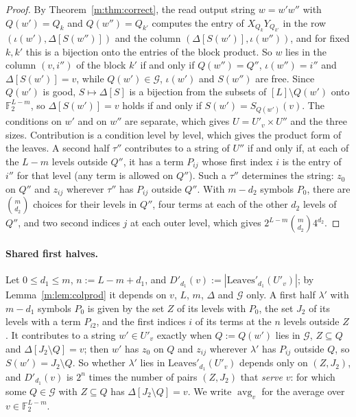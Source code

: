 \documentclass[11pt]{article}
\theoremstyle{definition}
\theoremstyle{remark}
\newcommand{\F}{\mathbb{F}_2}
\newcommand{\Leaves}{\mathrm{Leaves}}
\newcommand{\Qg}{\mathcal{G}}
\begin{document}
\begin{proof}
By Theorem~\ref{m:thm:correct}, the read output string $w=w'w''$ with $Q(w')=Q_k$ and $Q(w'')=Q_{k'}$ computes the entry of $X_{Q_k}Y_{Q_{k'}}$ in the row $(\iota(w'),\Delta[S(w'')])$ and the column $(\Delta[S(w')],\iota(w''))$, and for fixed $k,k'$ this is a bijection onto the entries of the block product. So $w$ lies in the column $(v,i'')$ of the block $k'$ if and only if $Q(w'')=Q''$, $\iota(w'')=i''$ and $\Delta[S(w')]=v$, while $Q(w')\in\Qg$, $\iota(w')$ and $S(w'')$ are free. Since $Q(w')$ is good, $S\mapsto\Delta[S]$ is a bijection from the subsets of $[L]\setminus Q(w')$ onto $\F^{L-m}$, so $\Delta[S(w')]=v$ holds if and only if $S(w')=S_{Q(w')}(v)$. The conditions on $w'$ and on $w''$ are separate, which gives $U=U'_v\times U''$ and the three sizes. Contribution is a condition level by level, which gives the product form of the leaves. A second half $\tau''$ contributes to a string of $U''$ if and only if, at each of the $L-m$ levels outside $Q''$, it has a term $P_{ij}$ whose first index $i$ is the entry of $i''$ for that level (any term is allowed on $Q''$). Such a $\tau''$ determines the string: $z_0$ on $Q''$ and $z_{ij}$ wherever $\tau''$ has $P_{ij}$ outside $Q''$. With $m-d_2$ symbols $P_0$, there are $\binom m{d_2}$ choices for their levels in $Q''$, four terms at each of the other $d_2$ levels of $Q''$, and two second indices $j$ at each outer level, which gives $2^{L-m}\binom m{d_2}4^{d_2}$.
\end{proof}

\paragraph{Shared first halves.} Let $0\le d_1\le m$, $n:=L-m+d_1$, and $D'_{d_1}(v):=|\Leaves'_{d_1}(U'_v)|$; by Lemma~\ref{m:lem:colprod} it depends on $v$, $L$, $m$, $\Delta$ and $\Qg$ only. A first half $\lambda'$ with $m-d_1$ symbols $P_0$ is given by the set $Z$ of its levels with $P_0$, the set $J_2$ of its levels with a term $P_{i2}$, and the first indices $i$ of its terms at the $n$ levels outside $Z$. It contributes to a string $w'\in U'_v$ exactly when $Q:=Q(w')$ lies in $\Qg$, $Z\subseteq Q$ and $\Delta[J_2\setminus Q]=v$; then $w'$ has $z_0$ on $Q$ and $z_{ij}$ wherever $\lambda'$ has $P_{ij}$ outside $Q$, so $S(w')=J_2\setminus Q$. So whether $\lambda'$ lies in $\Leaves'_{d_1}(U'_v)$ depends only on $(Z,J_2)$, and $D'_{d_1}(v)$ is $2^n$ times the number of pairs $(Z,J_2)$ that \emph{serve} $v$: for which some $Q\in\Qg$ with $Z\subseteq Q$ has $\Delta[J_2\setminus Q]=v$. We write $\operatorname{avg}_v$ for the average over $v\in\F^{L-m}$.
\end{document}
